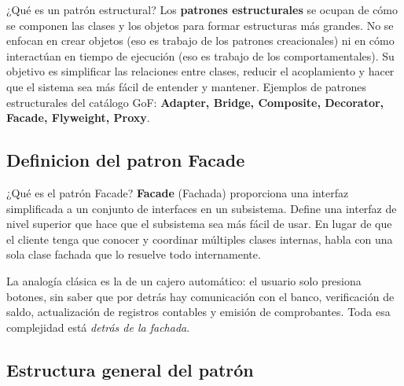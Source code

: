 \documentclass[12pt,a4paper]{article}
\begin{document}
\begin{patternbox}{¿Qué es un patrón estructural?}
Los \textbf{patrones estructurales} se ocupan de cómo se componen las
clases y los objetos para formar estructuras más grandes. No se enfocan
en crear objetos (eso es trabajo de los patrones creacionales) ni en
cómo interactúan en tiempo de ejecución (eso es trabajo de los
comportamentales). Su objetivo es simplificar las relaciones entre clases,
reducir el acoplamiento y hacer que el sistema sea más fácil de entender
y mantener. Ejemplos de patrones estructurales del catálogo GoF:
\textbf{Adapter, Bridge, Composite, Decorator, Facade, Flyweight, Proxy}.
\end{patternbox}

\vspace{0.5em}

\subsection{Definicion del patron Facade}

\begin{patternbox}{¿Qué es el patrón Facade?}
\textbf{Facade} (Fachada) proporciona una interfaz simplificada a un
conjunto de interfaces en un subsistema. Define una interfaz de nivel
superior que hace que el subsistema sea más fácil de usar. En lugar de
que el cliente tenga que conocer y coordinar múltiples clases internas,
habla con una sola clase fachada que lo resuelve todo internamente.
\end{patternbox}

La analogía clásica es la de un cajero automático: el usuario solo
presiona botones, sin saber que por detrás hay comunicación con el
banco, verificación de saldo, actualización de registros contables y
emisión de comprobantes. Toda esa complejidad está \textit{detrás de la fachada}.

\subsection{Estructura general del patrón}
\end{document}
